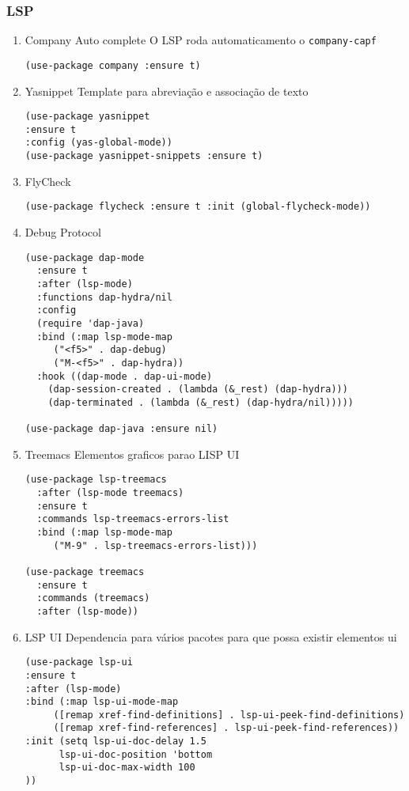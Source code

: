 \documentclass[11pt]{article}
\begin{document}
\subsubsection{LSP}
\label{sec:orgf8fde5e}
\begin{enumerate}
\item Company
\label{sec:org2cc063e}
Auto complete 
O LSP roda automaticamento o \texttt{company-capf} 
\begin{verbatim}
(use-package company :ensure t)
\end{verbatim}

\item Yasnippet
\label{sec:orgc90f088}
Template para abreviação e associação de texto
\begin{verbatim}
(use-package yasnippet 
:ensure t 
:config (yas-global-mode))
(use-package yasnippet-snippets :ensure t)
\end{verbatim}

\item FlyCheck
\label{sec:orgc6cf03d}
\begin{verbatim}
(use-package flycheck :ensure t :init (global-flycheck-mode))
\end{verbatim}

\item Debug Protocol
\label{sec:org40c2ff2}
\begin{verbatim}
(use-package dap-mode
  :ensure t
  :after (lsp-mode)
  :functions dap-hydra/nil
  :config
  (require 'dap-java)
  :bind (:map lsp-mode-map
	 ("<f5>" . dap-debug)
	 ("M-<f5>" . dap-hydra))
  :hook ((dap-mode . dap-ui-mode)
    (dap-session-created . (lambda (&_rest) (dap-hydra)))
    (dap-terminated . (lambda (&_rest) (dap-hydra/nil)))))

(use-package dap-java :ensure nil)
\end{verbatim}

\item Treemacs
\label{sec:org41ed39c}
Elementos graficos parao LISP UI
\begin{verbatim}
(use-package lsp-treemacs
  :after (lsp-mode treemacs)
  :ensure t
  :commands lsp-treemacs-errors-list
  :bind (:map lsp-mode-map
	 ("M-9" . lsp-treemacs-errors-list)))

(use-package treemacs
  :ensure t
  :commands (treemacs)
  :after (lsp-mode))
\end{verbatim}

\item LSP UI
\label{sec:org13634d1}
Dependencia para vários pacotes para que possa existir elementos ui
\begin{verbatim}
(use-package lsp-ui
:ensure t
:after (lsp-mode)
:bind (:map lsp-ui-mode-map
	 ([remap xref-find-definitions] . lsp-ui-peek-find-definitions)
	 ([remap xref-find-references] . lsp-ui-peek-find-references))
:init (setq lsp-ui-doc-delay 1.5
      lsp-ui-doc-position 'bottom
	  lsp-ui-doc-max-width 100
))
\end{verbatim}


\end{enumerate}
\end{document}
